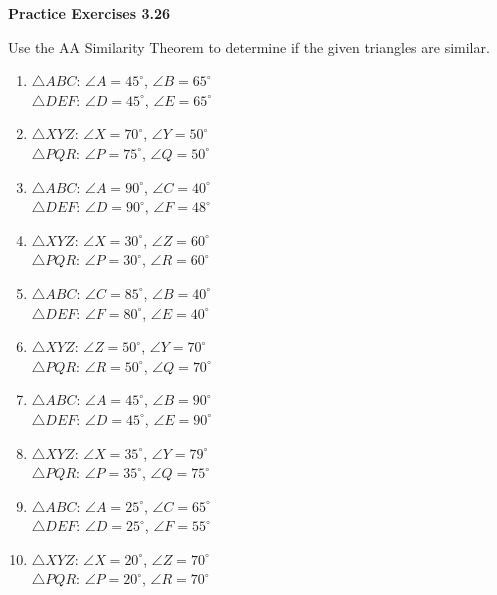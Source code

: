 \vspace{0.3ex}
\noindent\textbf{Practice Exercises 3.26}

\vspace{0.2ex}

Use the AA Similarity Theorem to determine if the given triangles are similar. 
\begin{multicols}{2}				

\begin{enumerate}[label=\color{blue}\arabic*.]
    \item \(\triangle ABC\): \(\angle A = 45^\circ\), \(\angle B = 65^\circ\) \\
          \(\triangle DEF\): \(\angle D = 45^\circ\), \(\angle E = 65^\circ\)
    \item \(\triangle XYZ\): \(\angle X = 70^\circ\), \(\angle Y = 50^\circ\) \\
          \(\triangle PQR\): \(\angle P = 75^\circ\), \(\angle Q = 50^\circ\)
    \item \(\triangle ABC\): \(\angle A = 90^\circ\), \(\angle C = 40^\circ\) \\
          \(\triangle DEF\): \(\angle D = 90^\circ\), \(\angle F = 48^\circ\)
    \item \(\triangle XYZ\): \(\angle X = 30^\circ\), \(\angle Z = 60^\circ\) \\
          \(\triangle PQR\): \(\angle P = 30^\circ\), \(\angle R = 60^\circ\)
    \item \(\triangle ABC\): \(\angle C = 85^\circ\), \(\angle B = 40^\circ\) \\
          \(\triangle DEF\): \(\angle F = 80^\circ\), \(\angle E = 40^\circ\)
    \item \(\triangle XYZ\): \(\angle Z = 50^\circ\), \(\angle Y = 70^\circ\) \\
          \(\triangle PQR\): \(\angle R = 50^\circ\), \(\angle Q = 70^\circ\)
    \item \(\triangle ABC\): \(\angle A = 45^\circ\), \(\angle B = 90^\circ\) \\
          \(\triangle DEF\): \(\angle D = 45^\circ\), \(\angle E = 90^\circ\)
    \item \(\triangle XYZ\): \(\angle X = 35^\circ\), \(\angle Y = 79^\circ\) \\
          \(\triangle PQR\): \(\angle P = 35^\circ\), \(\angle Q = 75^\circ\)
    \item \(\triangle ABC\): \(\angle A = 25^\circ\), \(\angle C = 65^\circ\) \\
          \(\triangle DEF\): \(\angle D = 25^\circ\), \(\angle F = 55^\circ\)
    \item \(\triangle XYZ\): \(\angle X = 20^\circ\), \(\angle Z = 70^\circ\) \\
          \(\triangle PQR\): \(\angle P = 20^\circ\), \(\angle R = 70^\circ\)
\end{enumerate}
  
\end{multicols}
